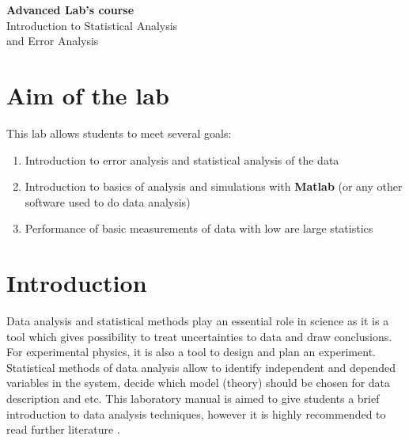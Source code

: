 \documentclass[12pt,a4paper]{report}
\begin{document}
\begin{center}
{\bf Advanced Lab's course} \\ %
Introduction to Statistical Analysis \\
and Error Analysis \\
\end{center}


\section{Aim of the lab}
This lab allows students to meet several goals:
\begin{enumerate}
\item Introduction to error analysis and statistical analysis of the data
\item Introduction to basics of analysis and simulations with \textbf{Matlab} (or any other software used to do data analysis)
\item Performance of basic measurements of data with low are large statistics
\end{enumerate}


\section{Introduction}
Data analysis and statistical methods play an essential role in science as it is a tool which gives possibility to treat uncertainties to data and draw conclusions. For experimental physics, it is also a tool to design and plan an experiment. Statistical methods of data analysis allow to identify independent and depended variables in the system, decide which model (theory) should be chosen for data description and etc. This laboratory manual is aimed to give students a brief introduction to data analysis techniques, however it is highly recommended to read further literature \cite{stat_1, stat_2, stat_3}.
\end{document}
